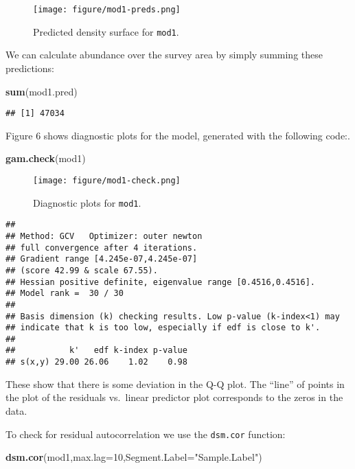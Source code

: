 \documentclass[]{article}
\newenvironment{Shaded}{}{}
\newcommand{\KeywordTok}[1]{\textcolor[rgb]{0.00,0.44,0.13}{\textbf{{#1}}}}
\newcommand{\DataTypeTok}[1]{\textcolor[rgb]{0.56,0.13,0.00}{{#1}}}
\newcommand{\DecValTok}[1]{\textcolor[rgb]{0.25,0.63,0.44}{{#1}}}
\newcommand{\StringTok}[1]{\textcolor[rgb]{0.25,0.44,0.63}{{#1}}}
\newcommand{\NormalTok}[1]{{#1}}
\begin{document}
\begin{figure}[htbp]
\centering
\texttt{[image: figure/mod1-preds.png]}
\caption{Predicted density surface for \texttt{mod1}.}
\end{figure}

We can calculate abundance over the survey area by simply summing these
predictions:

\begin{Shaded}
\begin{Highlighting}[]
\KeywordTok{sum}\NormalTok{(mod1.pred)}
\end{Highlighting}
\end{Shaded}

\begin{verbatim}
## [1] 47034
\end{verbatim}

Figure 6 shows diagnostic plots for the model, generated with the
following code:.

\begin{Shaded}
\begin{Highlighting}[]
\KeywordTok{gam.check}\NormalTok{(mod1)}
\end{Highlighting}
\end{Shaded}

\begin{figure}[htbp]
\centering
\texttt{[image: figure/mod1-check.png]}
\caption{Diagnostic plots for \texttt{mod1}.}
\end{figure}

\begin{verbatim}
## 
## Method: GCV   Optimizer: outer newton
## full convergence after 4 iterations.
## Gradient range [4.245e-07,4.245e-07]
## (score 42.99 & scale 67.55).
## Hessian positive definite, eigenvalue range [0.4516,0.4516].
## Model rank =  30 / 30 
## 
## Basis dimension (k) checking results. Low p-value (k-index<1) may
## indicate that k is too low, especially if edf is close to k'.
## 
##           k'   edf k-index p-value
## s(x,y) 29.00 26.06    1.02    0.98
\end{verbatim}

These show that there is some deviation in the Q-Q plot. The ``line'' of
points in the plot of the residuals vs.~linear predictor plot
corresponds to the zeros in the data.

To check for residual autocorrelation we use the \texttt{dsm.cor}
function:

\begin{Shaded}
\begin{Highlighting}[]
\KeywordTok{dsm.cor}\NormalTok{(mod1,}\DataTypeTok{max.lag=}\DecValTok{10}\NormalTok{,}\DataTypeTok{Segment.Label=}\StringTok{"Sample.Label"}\NormalTok{)}
\end{Highlighting}
\end{Shaded}
\end{document}
